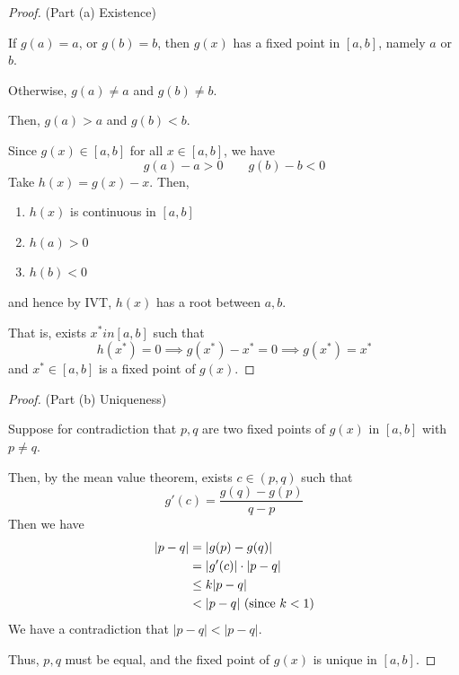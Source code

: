 \begin{proof}(Part (a) Existence)

    If \( g(a) = a \), or \( g(b) = b \), then \( g(x) \) has a fixed point in \( [a, b] \), namely \( a \) or \( b \).

    Otherwise, \( g(a) \neq a \) and \( g(b) \neq b \).

    Then, \( g(a) > a \) and \( g(b) < b \).

    Since \( g(x) \in [a, b] \) for all \( x \in [a, b] \), we have \[
        g(a) - a > 0 \qquad g(b) - b < 0
    \]
    Take \( h(x) = g(x) - x \). Then,
    \begin{enumerate}
        \item \( h(x) \) is continuous in \( [a, b] \)
        \item \( h(a) > 0 \)
        \item \( h(b) < 0 \)
    \end{enumerate}
    and hence by IVT, \( h(x) \) has a root between \( a, b \).

    That is, exists \( x^\ast in [a, b] \) such that \[
        h(x^\ast) = 0 \implies g(x^\ast) - x^\ast = 0 \implies g(x^\ast) = x^\ast
    \] and \( x^\ast \in [a, b] \) is a fixed point of \( g(x) \).
\end{proof}

\begin{proof}(Part (b) Uniqueness)

    Suppose for contradiction that \( p, q \) are two fixed points of \( g(x) \) in \( [a, b] \) with \( p \neq q \).

    Then, by the mean value theorem, exists \( c \in (p, q) \) such that \[
        g'(c) = \frac{g(q) - g(p)}{q - p}
    \]
    Then we have \begin{align*}
        | p - q | & = | g(p) - g(q) |                       \\
                  & = | g'(c) | \cdot | p - q |             \\
                  & \leq k | p - q |                        \\
                  & < | p - q | \text{ (since \( k < 1 \))}
    \end{align*}
    We have a contradiction that \( | p - q | < | p - q | \).

    Thus, \( p, q \) must be equal, and the fixed point of \( g(x) \) is unique in \( [a, b] \).
\end{proof}

